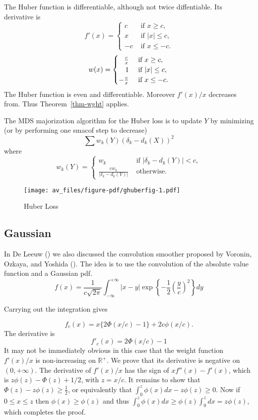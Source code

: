 \documentclass[
  12pt,
  letterpaper,
  DIV=11,
  numbers=noendperiod]{scrartcl}
\theoremstyle{plain}
\theoremstyle{plain}
\theoremstyle{plain}
\theoremstyle{definition}
\theoremstyle{remark}
\begin{document}
The Huber function is differentiable, although not twice diffentiable.
Its derivative is \[
f'(x)=\begin{cases}
c&\text{ if }x\geq c,\\
x&\text{ if }|x|\leq c,\\
-c&\text{ if }x\leq -c.
\end{cases}
\] \[
w(x)=
\begin{cases}
\hfill\frac{c}{x}&\text{ if }x\geq c,\\
\hfill1&\text{ if }|x|\leq c,\\
-\frac{c}{x}&\text{ if }x\leq -c.
\end{cases}
\] The Huber function is even and differentiable. Moreover \(f'(x)/x\)
decreases from. Thus Theorem~\ref{thm-wght} applies.

The MDS majorization algorithm for the Huber loss is to update \(Y\) by
minimizing (or by performing one smacof step to decrease) \[
\sum w_k(Y)(\delta_k-d_k(X))^2
\] where \[
w_k(Y)=\begin{cases}
w_k&\text{ if }|\delta_k-d_k(Y)|<c,\\
\frac{cw_k}{|\delta_k-d_k(Y)|}&\text{ otherwise}.
\end{cases}
\]

\begin{figure}[H]

{\centering \texttt{[image: av\_files/figure-pdf/ghuberfig-1.pdf]}

}

\caption{Huber Loss}

\end{figure}%

\subsection{Gaussian}\label{gaussian}

In De Leeuw () we also discussed the
convolution smoother proposed by Voronin, Ozkaya, and Yoshida
(). The idea is to use the
convolution of the absolute value function and a Gaussian pdf. \[
f(x)=\frac{1}{c\sqrt{2\pi}}\int_{-\infty}^{+\infty}|x-y|\exp\left\{-\frac12(\frac{y}{c})^2\right\}dy
\]

Carrying out the integration gives

\[
f_c(x)=x\{2\Phi(x/c)-1\}+2c\phi(x/c).
\] The derivative is \[
f'_c(x)=2\Phi(x/c)-1
\] It may not be immediately obvious in this case that the weight
function \(f'(x)/x\) is non-increasing on \(\mathbb{R}^+\). We prove
that its derivative is negative on \((0,+\infty)\). The derivative of
\(f'(x)/x\) has the sign of \(xf''(x)-f'(x)\), which is
\(z\phi(z)-\Phi(z)+1/2\), with \(z=x/c\). It remains to show that
\(\Phi(z)-z\phi(z)\geq\frac12\), or equivalently that
\(\int_0^z\phi(x)dx-z\phi(z)\geq 0\). Now if \(0\leq x\leq z\) then
\(\phi(x)\geq\phi(z)\) and thus
\(\int_0^z\phi(x)dx\geq\phi(z)\int_0^zdx=z\phi(z)\), which completes the
proof.
\end{document}
